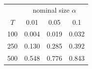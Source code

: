% 
\begin{tabular}{cccc}
  \hline
  & \multicolumn{3}{c}{nominal size $\alpha$} \\
 $T$ & 0.01 & 0.05 & 0.1 \\
 \hline
100 & 0.004 & 0.019 & 0.032 \\ 
  250 & 0.130 & 0.285 & 0.392 \\ 
  500 & 0.548 & 0.776 & 0.843 \\ 
   \hline
\end{tabular}
